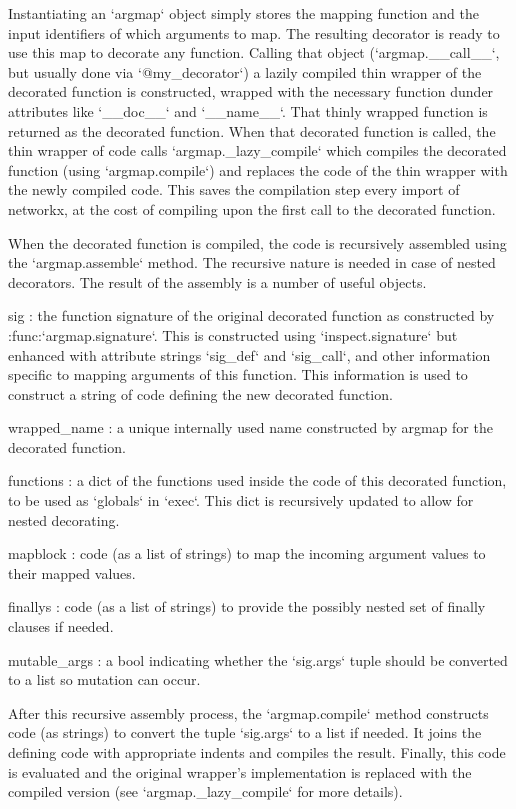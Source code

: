 \begin{DoxyVerb}
Instantiating an `argmap` object simply stores the mapping function and
the input identifiers of which arguments to map. The resulting decorator
is ready to use this map to decorate any function. Calling that object
(`argmap.__call__`, but usually done via `@my_decorator`) a lazily
compiled thin wrapper of the decorated function is constructed,
wrapped with the necessary function dunder attributes like `__doc__`
and `__name__`. That thinly wrapped function is returned as the
decorated function. When that decorated function is called, the thin
wrapper of code calls `argmap._lazy_compile` which compiles the decorated
function (using `argmap.compile`) and replaces the code of the thin
wrapper with the newly compiled code. This saves the compilation step
every import of networkx, at the cost of compiling upon the first call
to the decorated function.

When the decorated function is compiled, the code is recursively assembled
using the `argmap.assemble` method. The recursive nature is needed in
case of nested decorators. The result of the assembly is a number of
useful objects.

  sig : the function signature of the original decorated function as
      constructed by :func:`argmap.signature`. This is constructed
      using `inspect.signature` but enhanced with attribute
      strings `sig_def` and `sig_call`, and other information
      specific to mapping arguments of this function.
      This information is used to construct a string of code defining
      the new decorated function.

  wrapped_name : a unique internally used name constructed by argmap
      for the decorated function.

  functions : a dict of the functions used inside the code of this
      decorated function, to be used as `globals` in `exec`.
      This dict is recursively updated to allow for nested decorating.

  mapblock : code (as a list of strings) to map the incoming argument
      values to their mapped values.

  finallys : code (as a list of strings) to provide the possibly nested
      set of finally clauses if needed.

  mutable_args : a bool indicating whether the `sig.args` tuple should be
      converted to a list so mutation can occur.

After this recursive assembly process, the `argmap.compile` method
constructs code (as strings) to convert the tuple `sig.args` to a list
if needed. It joins the defining code with appropriate indents and
compiles the result.  Finally, this code is evaluated and the original
wrapper's implementation is replaced with the compiled version (see
`argmap._lazy_compile` for more details).


\end{DoxyVerb}
